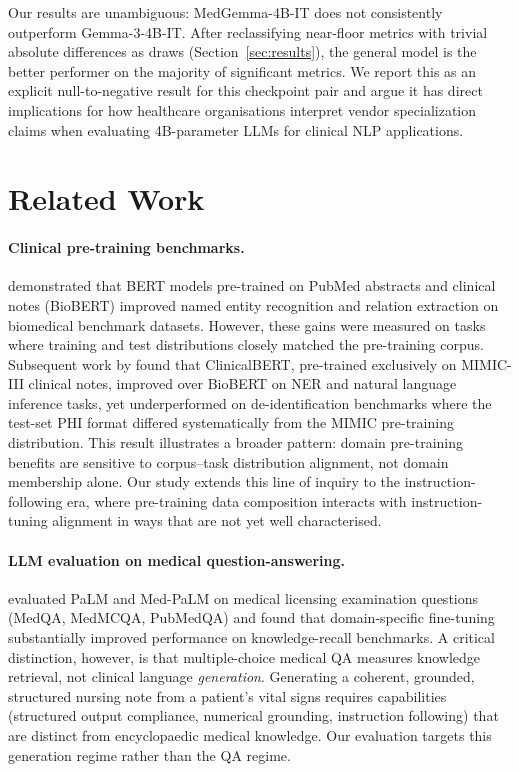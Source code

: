 \documentclass[sigconf,anonymous=false,review=false]{acmart}
\newcommand{\medgemma}{MedGemma-4B-IT\xspace}
\newcommand{\gemma}{Gemma-3-4B-IT\xspace}
\begin{document}
Our results are unambiguous: \medgemma does not consistently outperform
\gemma. After reclassifying near-floor metrics with trivial absolute
differences as draws (Section~\ref{sec:results}), the general model is the
better performer on the majority of significant metrics. We report this as
an explicit null-to-negative result for this checkpoint pair and argue it
has direct implications for how healthcare organisations interpret vendor
specialization claims when evaluating 4B-parameter LLMs for clinical NLP
applications.

\section{Related Work}
\label{sec:related}

\paragraph{Clinical pre-training benchmarks.}
\citet{lee2020biobert} demonstrated that BERT models pre-trained on PubMed
abstracts and clinical notes (BioBERT) improved named entity recognition
and relation extraction on biomedical benchmark datasets. However, these gains
were measured on tasks where training and test distributions closely matched
the pre-training corpus. Subsequent work by \citet{alsentzer2019publicly}
found that ClinicalBERT, pre-trained exclusively on MIMIC-III clinical
notes, improved over BioBERT on NER and natural language inference tasks,
yet underperformed on de-identification benchmarks where the test-set PHI
format differed systematically from the MIMIC pre-training distribution.
This result illustrates a broader pattern: domain pre-training benefits
are sensitive to corpus--task distribution alignment, not domain membership
alone. Our study
extends this line of inquiry to the instruction-following era, where
pre-training data composition interacts with instruction-tuning alignment
in ways that are not yet well characterised.

\paragraph{LLM evaluation on medical question-answering.}
\citet{singhal2023large} evaluated PaLM and Med-PaLM on medical licensing
examination questions (MedQA, MedMCQA, PubMedQA) and found that
domain-specific fine-tuning substantially improved performance on
knowledge-recall benchmarks. A critical distinction, however, is that
multiple-choice medical QA measures knowledge retrieval, not clinical
language \emph{generation}. Generating a coherent, grounded, structured
nursing note from a patient's vital signs requires capabilities (structured
output compliance, numerical grounding, instruction following) that are
distinct from encyclopaedic medical knowledge. Our evaluation targets this
generation regime rather than the QA regime.
\end{document}
